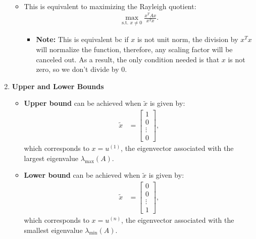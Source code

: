 \begin{derivation}
\begin{enumerate}
\begin{itemize}
\begin{align*}
                \end{align*}
            \item This is equivalent to maximizing the Rayleigh quotient:
                \begin{align*}
                    \max_{\text{s.t. } x \neq 0} \frac{x^T A x}{x^T x}.
                \end{align*}
                \begin{itemize}
                    \item \textbf{Note:} This is equivalent bc if $x$ is not unit norm, the division by $x^T x$ will normalize the function, therefore, any scaling factor will be canceled out. As a result, the only condition needed is that $x$ is not zero, so we don't divide by 0.
                \end{itemize}
        \end{itemize}
        \item \textbf{Upper and Lower Bounds}
        \begin{itemize}
            \item \textbf{Upper bound} can be achieved when $\tilde{x}$ is given by:
            \begin{align*}
                \tilde{x} &= 
                \begin{bmatrix}
                    1 \\ 
                    0 \\ 
                    \vdots \\ 
                    0 
                \end{bmatrix},
            \end{align*}
            which corresponds to $x = u^{(1)}$, the eigenvector associated with the largest eigenvalue $\lambda_{\max}(A)$.
        
            \item \textbf{Lower bound} can be achieved when $\tilde{x}$ is given by:
            \begin{align*}
                \tilde{x} &= 
                \begin{bmatrix}
                    0 \\ 
                    0 \\ 
                    \vdots \\ 
                    1 
                \end{bmatrix},
            \end{align*}
            which corresponds to $x = u^{(n)}$, the eigenvector associated with the smallest eigenvalue $\lambda_{\min}(A)$.
        \end{itemize}
        

\end{enumerate}
\end{derivation}
